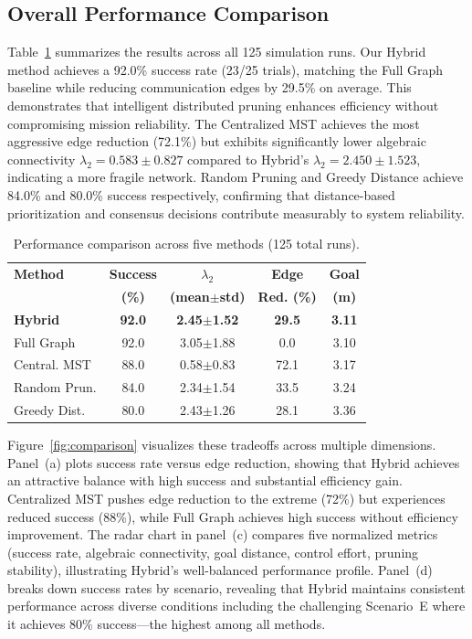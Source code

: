 \documentclass[conference]{IEEEconf}
\theoremstyle{plain}
\begin{document}
\subsection{Overall Performance Comparison}

Table~\ref{tab:performance} summarizes the results across all 125 simulation runs. Our Hybrid method achieves a 92.0\% success rate (23/25 trials), matching the Full Graph baseline while reducing communication edges by 29.5\% on average. This demonstrates that intelligent distributed pruning enhances efficiency without compromising mission reliability. The Centralized MST achieves the most aggressive edge reduction (72.1\%) but exhibits significantly lower algebraic connectivity $\lambda_2 = 0.583 \pm 0.827$ compared to Hybrid's $\lambda_2 = 2.450 \pm 1.523$, indicating a more fragile network. Random Pruning and Greedy Distance achieve 84.0\% and 80.0\% success respectively, confirming that distance-based prioritization and consensus decisions contribute measurably to system reliability.

\begin{table}[t]
\centering
\caption{Performance comparison across five methods (125 total runs).}
\label{tab:performance}
\footnotesize
\begin{tabular}{@{}lcccc@{}}
\hline
\textbf{Method} & \textbf{Success} & \textbf{$\lambda_2$} & \textbf{Edge} & \textbf{Goal} \\
 & \textbf{(\%)} & \textbf{(mean$\pm$std)} & \textbf{Red. (\%)} & \textbf{(m)} \\
\hline
\textbf{Hybrid} & \textbf{92.0} & \textbf{2.45$\pm$1.52} & \textbf{29.5} & \textbf{3.11} \\
Full Graph & 92.0 & 3.05$\pm$1.88 & 0.0 & 3.10 \\
Central. MST & 88.0 & 0.58$\pm$0.83 & 72.1 & 3.17 \\
Random Prun. & 84.0 & 2.34$\pm$1.54 & 33.5 & 3.24 \\
Greedy Dist. & 80.0 & 2.43$\pm$1.26 & 28.1 & 3.36 \\
\hline
\end{tabular}
\end{table}


Figure~\ref{fig:comparison} visualizes these tradeoffs across multiple dimensions. Panel~(a) plots success rate versus edge reduction, showing that Hybrid achieves an attractive balance with high success and substantial efficiency gain. Centralized MST pushes edge reduction to the extreme (72\%) but experiences reduced success (88\%), while Full Graph achieves high success without efficiency improvement. The radar chart in panel~(c) compares five normalized metrics (success rate, algebraic connectivity, goal distance, control effort, pruning stability), illustrating Hybrid's well-balanced performance profile. Panel~(d) breaks down success rates by scenario, revealing that Hybrid maintains consistent performance across diverse conditions including the challenging Scenario~E where it achieves 80\% success---the highest among all methods.
\end{document}
